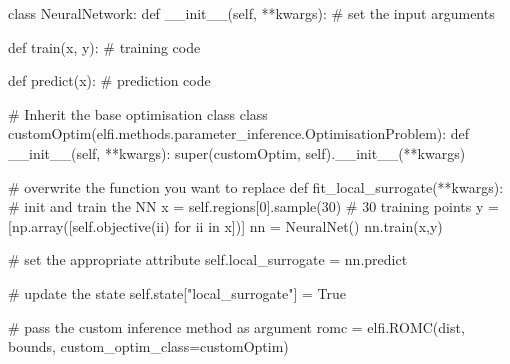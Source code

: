 \newpage 

\begin{pythoncode}
  class NeuralNetwork:
      def __init__(self, **kwargs):
          # set the input arguments

      def train(x, y):
          # training code

      def predict(x):
          # prediction code

  # Inherit the base optimisation class
  class customOptim(elfi.methods.parameter_inference.OptimisationProblem):
      def __init__(self, **kwargs):
          super(customOptim, self).__init__(**kwargs)

      # overwrite the function you want to replace
      def fit_local_surrogate(**kwargs):
          # init and train the NN
          x = self.regions[0].sample(30) # 30 training points
          y = [np.array([self.objective(ii) for ii in x])]
          nn = NeuralNet()
          nn.train(x,y)

          # set the appropriate attribute
          self.local_surrogate = nn.predict

          # update the state
          self.state["local_surrogate"] = True

  # pass the custom inference method as argument
  romc = elfi.ROMC(dist, bounds, custom_optim_class=customOptim)
\end{pythoncode}

